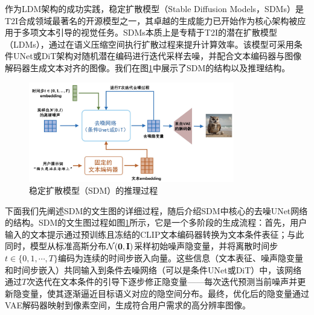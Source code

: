\documentclass[11pt,a4paper,UTF8]{ctexart}
\begin{document}
作为LDM架构的成功实践，稳定扩散模型（Stable Diffusion Models，SDMs）\cite{rombach2022high}是T2I合成领域最著名的开源模型之一，其卓越的生成能力已开始作为核心架构被应用于多项文本引导的视觉任务\cite{blattmann2023videoldm,brooks2023instructpix2pix,wang2023score,zhang2023adding}。SDMs本质上是专精于T2I的潜在扩散模型（LDMs）\cite{rombach2022high}，通过在语义压缩空间执行扩散过程\cite{ho2022classifier,liu2021pseudo,song2020denoising}来提升计算效率。该模型可采用条件UNet或DiT架构对随机潜在编码进行迭代采样去噪，并配合文本编码器\cite{radford2021learning}与图像解码器\cite{esser2021taming,van2017neural}生成文本对齐的图像。我们在图\ref{fig:sdm}中展示了SDM的结构以及推理结构。

\begin{figure}[htbp]
\centering
\includegraphics[width=0.8\textwidth]{img/SDM.jpg}
\caption{稳定扩散模型（SDM）的推理过程}
\label{fig:sdm}
\end{figure}

下面我们先阐述SDM的文生图的详细过程，随后介绍SDM中核心的去噪UNet网络的结构。SDM的文生图过程如图\ref{fig:sdm}所示，它是一个多阶段的生成流程：首先，用户输入的文本提示通过预训练且冻结的CLIP文本编码器转换为文本条件表征；与此同时，模型从标准高斯分布$\mathcal{N}(\mathbf{0},\mathbf{I})$采样初始噪声隐变量，并将离散时间步$t\in\{0,1,\cdots,T\}$编码为连续的时间步嵌入向量。这些信息（文本表征、噪声隐变量和时间步嵌入）共同输入到条件去噪网络（可以是条件UNet或DiT）中，该网络通过$T$次迭代在文本条件的引导下逐步修正隐变量——每次迭代预测当前噪声并更新隐变量，使其逐渐逼近目标语义对应的隐空间分布。最终，优化后的隐变量通过VAE解码器映射到像素空间，生成符合用户需求的高分辨率图像。
\end{document}
